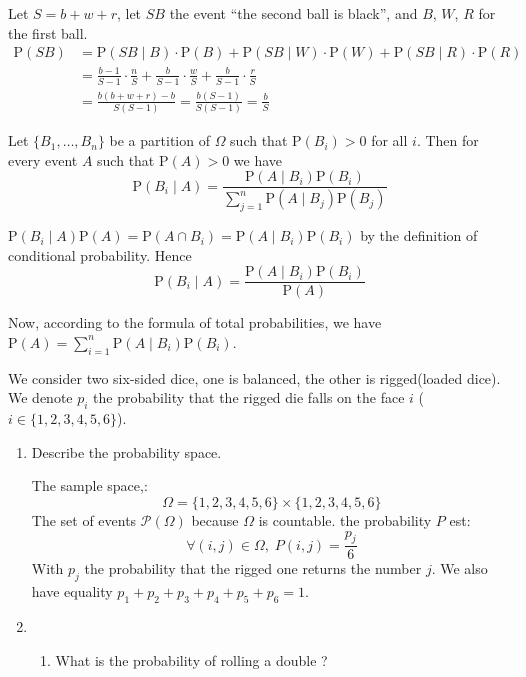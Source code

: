 \documentclass[a4paper,11pt]{exam}
\renewcommand{\P}{\mathrm{P}}
\begin{document}
\begin{questions}
\begin{solution}
	Let $S = b + w + r$, let $SB$ the event ``the second ball is black'', and $B$, $W$, $R$ for the first ball.
	\begin{align*}
	\P(SB)
	&= \P(SB \mid B)\cdot\P(B) + \P(SB \mid W)\cdot\P(W)
	+ \P(SB \mid R)\cdot\P(R)\\
	&= \frac{b-1}{S - 1} \cdot \frac{n}{S}
	+ \frac{b}{S - 1} \cdot \frac{w}{S} + \frac{b}{S - 1} \cdot \frac{r}{S}\\
	&= \frac{b(b+w+r) - b}{S(S-1)} = \frac{b(S-1)}{S(S-1)} = \frac{b}{S}
	\end{align*}
\end{solution} 

\question
Let $\{B_1,\dots,B_n\}$ be a partition of $\Omega$ such that $\P(B_i) > 0$ for all $i$.
Then for every event $A$ such that $\P(A) > 0$ we have
\[
\P(B_i \mid A)
= \frac{\P(A \mid B_i)\P(B_i)}{\sum_{j = 1}^n \P(A \mid B_j) \P(B_j)}
\]

\begin{solution}
	$\P(B_i \mid A) \P(A) = \P(A \cap B_i) = \P(A \mid B_i)\P(B_i)$ by the definition of conditional probability.
	Hence
	\[
	\P(B_i \mid A) = \frac{\P(A \mid B_i)\P(B_i)}{\P(A)}
	\]
	
	Now, according to the formula of total probabilities, we have
	$\P(A) = \sum_{i = 1}^n \P(A \mid B_i) \P(B_i)$.
\end{solution} 


\question
We consider two six-sided dice, one is balanced, the other is rigged(loaded dice).
We denote $ p_i $ the probability that the rigged die falls on the face  $i$ ($i\in\{1,2,3,4,5,6\}$).
\begin{enumerate}
	\item Describe the probability space.
	
	\begin{solution}
		The sample space,:
		\[
		\Omega = \{1,2,3,4,5,6\} ×\{1,2,3,4,5,6\}
		\]
		The set of events $\mathcal P(\Omega)$ because $\Omega$ is countable.
		the probability $P$ est:
		\[
		\forall (i,j) \in \Omega,\;  P(i,j) = \frac{p_j}{6}
		\]
		With $p_j$ the probability that the rigged  one returns the number $j$.
		We also have equality $p_1+p_2+p_3+p_4+p_5+p_6 = 1$.
	\end{solution}
	
	\item
	\begin{enumerate}
		\item What is the probability of rolling a double ?
		

\end{enumerate}
\end{enumerate}
\end{questions}
\end{document}
